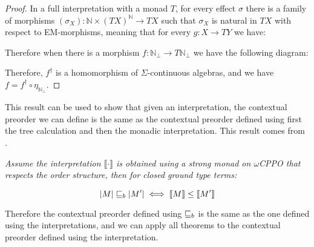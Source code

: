 \begin{ensps}
\begin{proof}
    In a full interpretation with a monad $T$, for every effect $\sigma$
    there is a family of morphisms $(\sigma_X) : \mathbb{N} \times (T X)^\mathbb{N} \to T X$
    such that $\sigma_X$ is natural in $T X$ with respect to EM-morphisms, meaning that for 
    every $g : X \to T Y$ we have:

    \begin{center}
    \end{center}

    Therefore when there is a morphism 
    $f : \mathbb{N}_\bot \to T \mathbb{N}_\bot$
    we have the following diagram:

    \begin{center}
    \end{center}

    Therefore, $f^\dagger$ is a homomorphism of $\Sigma$-continuous algebras,
    and we have 
    $f = f^\dagger \circ \eta_{\mathbb{N}_\bot}$.
\end{proof}
\end{ensps}

This result can be used to show that given an interpretation,
the contextual preorder we can define is the same as 
the contextual preorder defined using first the tree
calculation and then the monadic interpretation. This 
result comes from \cite{plotkin2001adequacy}.

\begin{acorollary}
    \em
    Assume the interpretation $\llbracket \cdot \rrbracket$ 
    is obtained using a strong monad on $\omega$CPPO that 
    respects the order structure, then for closed ground 
    type terms:

    \begin{equation*}
        |M| \sqsubseteq_b |M'| \iff \llbracket M \rrbracket \leq \llbracket M' \rrbracket
    \end{equation*}

    Therefore the contextual preorder defined using $\sqsubseteq_b$
    is the same as the one defined using the interpretations, and 
    we can apply all theorems to the contextual preorder defined 
    using the interpretation.
\end{acorollary}

